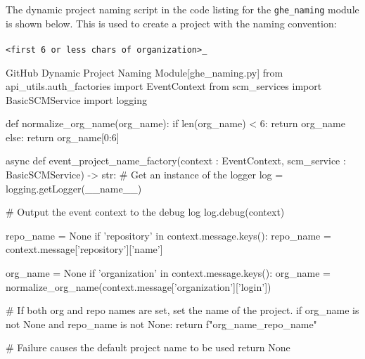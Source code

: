 The dynamic project naming script in the code listing for the \texttt{ghe\_naming}
module is shown below.  This is used to create a project with the naming convention:\\\\
\texttt{<first 6 or less chars of organization>\_<repo name>}\\


\begin{code}{GitHub Dynamic Project Naming Module}{[ghe\_naming.py]}{}
from api_utils.auth_factories import EventContext
from scm_services import BasicSCMService
import logging

def normalize_org_name(org_name):
    if len(org_name) < 6:
      return org_name
    else:
      return org_name[0:6]


async def event_project_name_factory(context : EventContext, scm_service : BasicSCMService) -> str:
  # Get an instance of the logger
  log = logging.getLogger(__name__)

  # Output the event context to the debug log
  log.debug(context)

  repo_name = None
  if 'repository' in context.message.keys():
     repo_name = context.message['repository']['name']

  org_name = None
  if 'organization' in context.message.keys():
     org_name = normalize_org_name(context.message['organization']['login'])

  # If both org and repo names are set, set the name of the project.
  if org_name is not None and repo_name is not None:
     return f"{org_name}_{repo_name}"
  
  # Failure causes the default project name to be used
  return None
\end{code}
